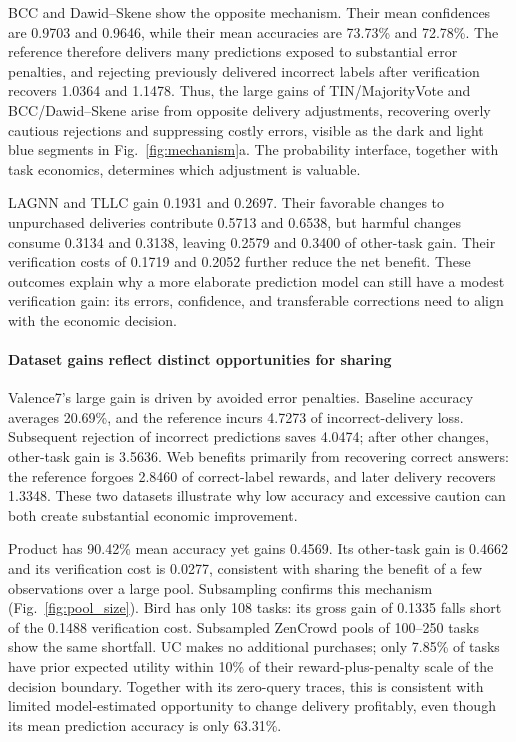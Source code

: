 \documentclass[journal]{IEEEtran}
\begin{document}
BCC and Dawid--Skene show the opposite mechanism. Their mean confidences are 0.9703 and 0.9646, while their mean accuracies are 73.73\% and 72.78\%. The reference therefore delivers many predictions exposed to substantial error penalties, and rejecting previously delivered incorrect labels after verification recovers 1.0364 and 1.1478. Thus, the large gains of TIN/MajorityVote and BCC/Dawid--Skene arise from opposite delivery adjustments, recovering overly cautious rejections and suppressing costly errors, visible as the dark and light blue segments in Fig.~\ref{fig:mechanism}a. The probability interface, together with task economics, determines which adjustment is valuable.

LAGNN and TLLC gain 0.1931 and 0.2697. Their favorable changes to unpurchased deliveries contribute 0.5713 and 0.6538, but harmful changes consume 0.3134 and 0.3138, leaving 0.2579 and 0.3400 of other-task gain. Their verification costs of 0.1719 and 0.2052 further reduce the net benefit. These outcomes explain why a more elaborate prediction model can still have a modest verification gain: its errors, confidence, and transferable corrections need to align with the economic decision.

\paragraph{Dataset gains reflect distinct opportunities for sharing}
Valence7's large gain is driven by avoided error penalties. Baseline accuracy averages 20.69\%, and the reference incurs 4.7273 of incorrect-delivery loss. Subsequent rejection of incorrect predictions saves 4.0474; after other changes, other-task gain is 3.5636. Web benefits primarily from recovering correct answers: the reference forgoes 2.8460 of correct-label rewards, and later delivery recovers 1.3348. These two datasets illustrate why low accuracy and excessive caution can both create substantial economic improvement.

Product has 90.42\% mean accuracy yet gains 0.4569. Its other-task gain is 0.4662 and its verification cost is 0.0277, consistent with sharing the benefit of a few observations over a large pool. Subsampling confirms this mechanism (Fig.~\ref{fig:pool_size}). Bird has only 108 tasks: its gross gain of 0.1335 falls short of the 0.1488 verification cost. Subsampled ZenCrowd pools of 100--250 tasks show the same shortfall. UC makes no additional purchases; only 7.85\% of tasks have prior expected utility within 10\% of their reward-plus-penalty scale of the decision boundary. Together with its zero-query traces, this is consistent with limited model-estimated opportunity to change delivery profitably, even though its mean prediction accuracy is only 63.31\%.
\end{document}
